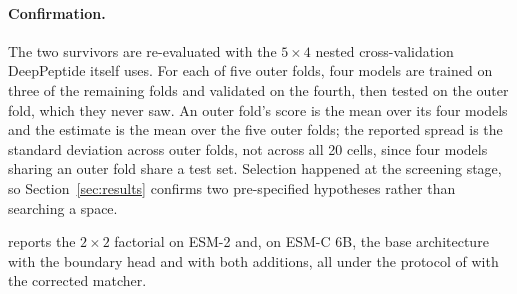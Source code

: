 \documentclass{article}
\begin{document}
\paragraph{Confirmation.} The two survivors are re-evaluated with the
$5\times4$ nested cross-validation DeepPeptide itself uses. For each of five
outer folds, four models are trained on three of the remaining folds and
validated on the fourth, then tested on the outer fold, which they never saw. An
outer fold's score is the mean over its four models and the estimate is the mean
over the five outer folds; the reported spread is the standard deviation across
outer folds, not across all 20 cells, since four models sharing an outer fold
share a test set. Selection happened at the screening stage, so
Section~\ref{sec:results} confirms two pre-specified hypotheses rather than
searching a space.
 
 reports the $2\times2$ factorial on ESM-2 and, on ESM-C 6B, the base architecture with the boundary head and with both additions, all under the protocol of  with the corrected matcher.
\end{document}
